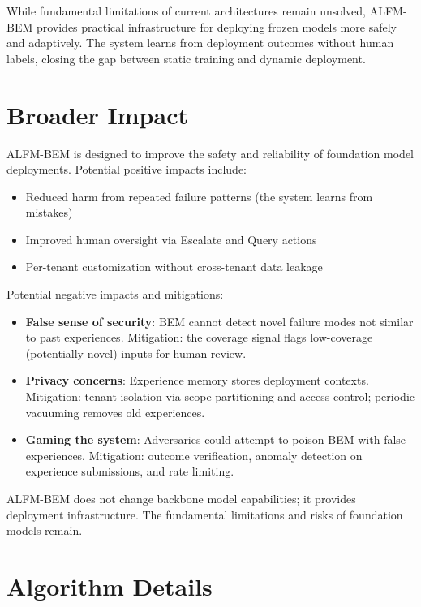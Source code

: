 \documentclass[twoside,11pt]{article}
\begin{document}
While fundamental limitations of current architectures remain unsolved, ALFM-BEM provides practical infrastructure for deploying frozen models more safely and adaptively. The system learns from deployment outcomes without human labels, closing the gap between static training and dynamic deployment.

\section*{Broader Impact}

ALFM-BEM is designed to improve the safety and reliability of foundation model deployments. Potential positive impacts include:
\begin{itemize}
    \item Reduced harm from repeated failure patterns (the system learns from mistakes)
    \item Improved human oversight via Escalate and Query actions
    \item Per-tenant customization without cross-tenant data leakage
\end{itemize}

Potential negative impacts and mitigations:
\begin{itemize}
    \item \textbf{False sense of security}: BEM cannot detect novel failure modes not similar to past experiences. Mitigation: the coverage signal flags low-coverage (potentially novel) inputs for human review.
    \item \textbf{Privacy concerns}: Experience memory stores deployment contexts. Mitigation: tenant isolation via scope-partitioning and access control; periodic vacuuming removes old experiences.
    \item \textbf{Gaming the system}: Adversaries could attempt to poison BEM with false experiences. Mitigation: outcome verification, anomaly detection on experience submissions, and rate limiting.
\end{itemize}

ALFM-BEM does not change backbone model capabilities; it provides deployment infrastructure. The fundamental limitations and risks of foundation models remain.




\appendix

\section{Algorithm Details}
\end{document}
